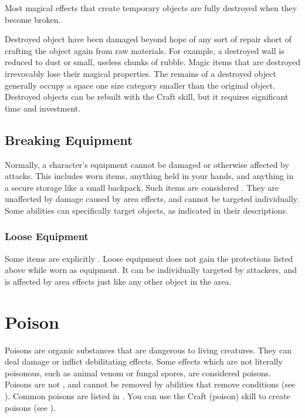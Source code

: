     Most magical effects that create temporary objects are fully destroyed when they become broken.

    Destroyed object have been damaged beyond hope of any sort of repair short of crafting the object again from raw materials.
    For example, a destroyed wall is reduced to dust or small, useless chunks of rubble.
    Magic items that are destroyed irrevocably lose their magical properties.
    The remains of a destroyed object generally occupy a space one size category smaller than the original object.
    Destroyed objects can be rebuilt with the Craft skill, but it requires significant time and investment.

  \subsection{Breaking Equipment}\label{Breaking Equipment}
    Normally, a character's equipment cannot be damaged or otherwise affected by attacks.
    This includes worn items, anything held in your hands, and anything in a secure storage like a small backpack.
    Such items are considered .
    They are unaffected by damage caused by area effects, and cannot be targeted individually.
    Some abilities can specifically target  objects, as indicated in their descriptions.

    \subsubsection{Loose Equipment}\label{Loose Equipment}
      Some items are explicitly .
      Loose equipment does not gain the protections listed above while worn as equipment.
      It can be individually targeted by attackers, and is affected by area effects just like any other object in the area.

\section{Poison}\label{Poison}
  Poisons are organic substances that are dangerous to living creatures.
  They can deal damage or inflict debilitating effects.
  Some effects which are not literally poisonous, such as animal venom or fungal spores, are considered poisons.
  Poisons are not , and cannot be removed by abilities that remove conditions (see ).
  Common poisons are listed in .
  You can use the Craft (poison) skill to create poisons (see ).

